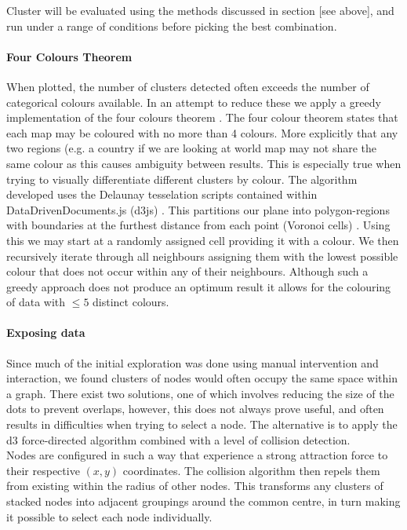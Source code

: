 Cluster will be evaluated using the methods discussed in section [see above], and run under a range of conditions before picking the best combination.

\paragraph{Four Colours Theorem}
When plotted, the number of clusters detected often exceeds the number of categorical colours available. In an attempt to reduce these we apply a greedy implementation of the four colours theorem \cite{fourcolour}.
The four colour theorem states that each map may be coloured with no more than 4 colours. More explicitly that any two regions (e.g. a country if we are looking at world map may not share the same colour as this causes ambiguity between results. This is especially true when trying to visually differentiate different clusters by colour. The algorithm developed uses the Delaunay tesselation scripts contained within DataDrivenDocuments.js (d3js) \cite{d3js}. This partitions our plane into polygon-regions with boundaries at the furthest distance from each point (Voronoi cells) \cite{delaunay}. Using this we may start at a randomly assigned cell providing it with a colour. We then recursively iterate through all neighbours assigning them with the lowest possible colour that does not occur within any of their neighbours. Although such a greedy approach does not produce an optimum result it allows for the colouring of data with $\le 5$ distinct colours.



\paragraph{Exposing data}
Since much of the initial exploration was done using manual intervention and interaction, we found clusters of nodes would often occupy the same space within a graph. There exist two solutions, one of which involves reducing the size of the dots to prevent overlaps, however, this does not always prove useful, and often results in difficulties when trying to select a node. The alternative is to apply the d3 force-directed algorithm combined with a level of collision detection. \\

Nodes are configured in such a way that experience a strong attraction force to their respective $(x,y)$ coordinates. The collision algorithm then repels them from existing within the radius of other nodes. This transforms any clusters of stacked nodes into adjacent groupings around the common centre, in turn making it possible to select each node individually.


